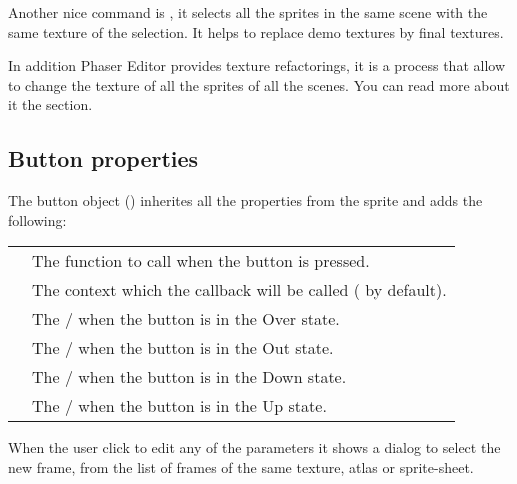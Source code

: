 \documentclass[letterpaper,10pt,english]{sphinxmanual}
\begin{document}
\noindent{}

Another nice command is , it selects all the sprites in the same scene with the same texture of the selection. It helps to replace demo textures by final textures.

In addition Phaser Editor provides texture refactorings, it is a process that allow to change the texture of all the sprites of all the scenes. You can read more about it the  section.


\subsection{Button properties}
\label{\detokenize{canvas:button-properties}}
The button object () inherites all the properties from the sprite and adds the following:


\begin{savenotes}\sphinxattablestart
\centering
\begin{tabulary}{\linewidth}[t]{|T|T|}
\hline
{}\relax &\relax \\
\hline
{}
&
The function to call when the button is pressed.
\\
\hline
{}
&
The context which the callback will be called ( by default).
\\
\hline
{}
&
The / when the button is in the Over state.
\\
\hline
{}
&
The / when the button is in the Out state.
\\
\hline
{}
&
The / when the button is in the Down state.
\\
\hline
{}
&
The / when the button is in the Up state.
\\
\hline
\end{tabulary}
\par
\sphinxattableend\end{savenotes}

When the user click to edit any of the  parameters it shows a dialog to select the new frame, from the list of frames of the same texture, atlas or sprite-sheet.
\end{document}
